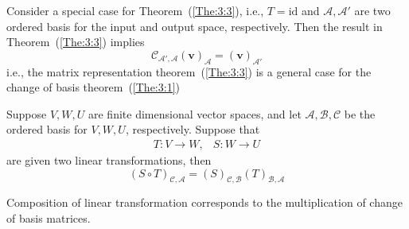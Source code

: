 \begin{remark}
Consider a special case for Theorem~(\ref{The:3:3}), i.e., $T=\text{id}$ and $\mathcal{A},\mathcal{A}'$ are two ordered basis for the input and output space, respectively. Then the result in Theorem~(\ref{The:3:3}) implies
\[
\mathcal{C}_{\mathcal{A}',\mathcal{A}}(\bm v)_{\mathcal{A}}=(\bm v)_{\mathcal{A}'}
\]
i.e., the matrix representation theorem~(\ref{The:3:3}) is a general case for the change of basis theorem~(\ref{The:3:1})
\end{remark}

\begin{proposition}[Functoriality]\label{pro:3:6}
Suppose $V,W,U$ are finite dimensional vector spaces,
and let $\mathcal{A},\mathcal{B},\mathcal{C}$ be the ordered basis for $V,W,U$, respectively. 
Suppose that
\[
\begin{array}{ll}
T:V\to W,
&
S:W\to U
\end{array}
\]
are given two linear transformations, then
\[
(S\circ T)_{\mathcal{C},\mathcal{A}}
=
(S)_{\mathcal{C},\mathcal{B}}(T)_{\mathcal{B},\mathcal{A}}
\]

Composition of linear transformation corresponds to the multiplication of change of basis matrices.
\end{proposition}
